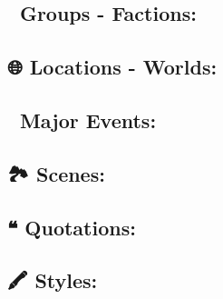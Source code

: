 \documentclass[11pt]{article}
\begin{document}
\subsection{👥 Groups - Factions:}
\label{sec:orgd937162}
\subsection{🌐 Locations - Worlds:}
\label{sec:org3bc19a5}
\subsection{🎪 Major Events:}
\label{sec:org81a50c3}
\subsection{🏞 Scenes:}
\label{sec:org845490e}
\subsection{❝ Quotations:}
\label{sec:org924fe8e}
\subsection{🖍 Styles:}
\label{sec:org381762a}
\end{document}
